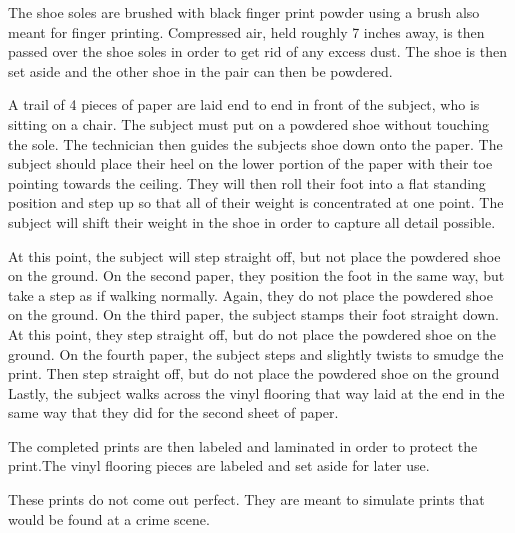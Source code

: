      The shoe soles are brushed with black finger print powder using a brush also meant for finger printing. Compressed air, held roughly 7 inches away, is then passed over the shoe soles in order to get rid of any excess dust. The shoe is then set aside and the other shoe in the pair can then be powdered. 
    
   A trail of 4 pieces of paper are laid end to end in front of the subject, who is sitting on a chair. The subject must put on a powdered shoe without touching the sole. The technician then guides the subjects shoe down onto the paper. The subject should place their heel on the lower portion of the paper with their toe pointing towards the ceiling. They will then roll their foot into a flat standing position and step up so that all of their weight is concentrated at one point. The subject will shift their weight in the shoe in order to capture all detail possible. 

  At this point, the subject will step straight off, but not place the powdered shoe on the ground. On the second paper, they position the foot in the same way, but take a step as if walking normally. Again, they do not place the powdered shoe on the ground. On the third paper, the subject stamps their foot straight down. At this point, they step straight off, but do not place the powdered shoe on the ground. On the fourth paper, the subject steps and slightly twists to smudge the print. Then step straight off, but do not place the powdered shoe on the ground Lastly, the subject walks across the vinyl flooring that way laid at the end in the same way that they did for the second sheet of paper. 

   The completed prints are then labeled and laminated in order to protect the print.The vinyl flooring pieces are labeled and set aside for later use. 
   
   These prints do not come out perfect. They are meant to simulate prints that would be found at a crime scene. 
   
